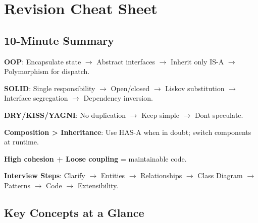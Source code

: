 \documentclass[11pt]{article}
\begin{document}
\section{Revision Cheat Sheet}\label{revision-cheat-sheet}

\subsection{10-Minute Summary}\label{10-minute-summary}

\textbf{OOP}: Encapsulate state \(\rightarrow\) Abstract interfaces \(\rightarrow\) Inherit only IS-A \(\rightarrow\) Polymorphism for dispatch.

\textbf{SOLID}: Single responsibility \(\rightarrow\) Open/closed \(\rightarrow\) Liskov substitution \(\rightarrow\) Interface segregation \(\rightarrow\) Dependency inversion.

\textbf{DRY/KISS/YAGNI}: No duplication \(\rightarrow\) Keep simple \(\rightarrow\) Don\textquotesingle t speculate.

\textbf{Composition \textgreater{} Inheritance}: Use HAS-A when in doubt; switch components at runtime.

\textbf{High cohesion + Loose coupling} = maintainable code.

\textbf{Interview Steps}: Clarify \(\rightarrow\) Entities \(\rightarrow\) Relationships \(\rightarrow\) Class Diagram \(\rightarrow\) Patterns \(\rightarrow\) Code \(\rightarrow\) Extensibility.

\subsection{Key Concepts at a Glance}\label{key-concepts-at-a-glance}
\end{document}
